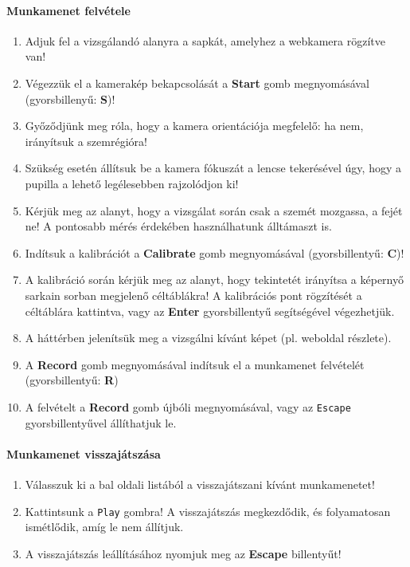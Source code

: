 \paragraph{Munkamenet felvétele}

\begin{enumerate}
  \item Adjuk fel a vizsgálandó alanyra a sapkát, amelyhez a webkamera rögzítve van!
  \item Végezzük el a kamerakép bekapcsolását a \textbf{Start} gomb megnyomásával (gyorsbillenyű: \textbf{S})!
  \item Győződjünk meg róla, hogy a kamera orientációja megfelelő: ha nem, irányítsuk a szemrégióra!
  \item Szükség esetén állítsuk be a kamera fókuszát a lencse tekerésével úgy, hogy a pupilla a lehető legélesebben rajzolódjon ki!
  \item Kérjük meg az alanyt, hogy a vizsgálat során csak a szemét mozgassa, a fejét ne! A pontosabb mérés érdekében használhatunk álltámaszt is.
  \item Indítsuk a kalibrációt a \textbf{Calibrate} gomb megnyomásával (gyorsbillentyű: \textbf{C})!
  \item A kalibráció során kérjük meg az alanyt, hogy tekintetét irányítsa a képernyő sarkain sorban megjelenő céltáblákra! A kalibrációs pont rögzítését a céltáblára kattintva, vagy az \textbf{Enter} gyorsbillentyű segítségével végezhetjük.
  \item A háttérben jelenítsük meg a vizsgálni kívánt képet (pl. weboldal részlete).
  \item A \textbf{Record} gomb megnyomásával indítsuk el a munkamenet felvételét (gyorsbillentyű: \textbf{R})
  \item A felvételt a \textbf{Record} gomb újbóli megnyomásával, vagy az \texttt{Escape} gyorsbillentyűvel állíthatjuk le.
\end{enumerate}

\paragraph{Munkamenet visszajátszása}

\begin{enumerate}
  \item Válasszuk ki a bal oldali listából a visszajátszani kívánt munkamenetet!
  \item Kattintsunk a \texttt{Play} gombra! A visszajátszás megkezdődik, és folyamatosan ismétlődik, amíg le nem állítjuk.
  \item A visszajátszás leállításához nyomjuk meg az \textbf{Escape} billentyűt!
\end{enumerate}

